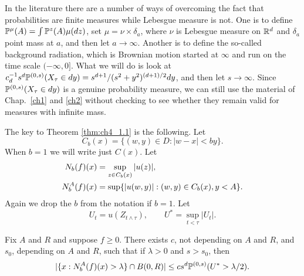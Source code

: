 In the literature there are a number of ways of overcoming the fact that probabilities are finite measures while Lebesgue measure is not. One is to define $\P^\mu(A) = \int \P^z(A)\mu(dz)$, set $\mu = \nu \times \delta_a$, where $\nu$ is Lebesgue measure on $\R^d$ and $\delta_a$ point mass at $a$, and then let $a \to \infty$. Another is to define the so-called background radiation, which is Brownian motion started at $\infty$ and run on the time scale $(-\infty,0]$. What we will do is look at $c_d^{-1}s^d\P^{(0,s)}(X_\tau \in dy) = s^{d+1}/(s^2+y^2)^{(d+1)/2}dy$, and then let $s \to \infty$. Since $\P^{(0,s)}(X_\tau \in dy)$ is a genuine probability measure, we can still use the material of Chap.\ \ref{ch1} and \ref{ch2} without checking to see whether they remain valid for measures with infinite mass.


The key to Theorem \ref{thm:ch4_1.1} is the following. Let
\begin{equation}\label{eq:ch4_1.5}
    C_b(x) = \{(w,y) \in D : |w-x| < by\}.
\end{equation}
When $b=1$ we will write just $C(x)$. Let
\begin{align}\label{eq:ch4_1.6}
    N_b(f)(x) &= \sup_{z\in C_b(x)} |u(z)|, \\
    N_b^A(f)(x) &= \sup\{|u(w,y)| : (w,y) \in C_b(x), y < A\}. \notag
\end{align}
Again we drop the $b$ from the notation if $b=1$. Let
\begin{equation}\label{eq:ch4_1.7}
    U_t = u(Z_{t\wedge\tau}), \qquad U^* = \sup_{t<\tau} |U_t|.
\end{equation}

\begin{proposition}\label{prop:ch4_1.3}
Fix $A$ and $R$ and suppose $f \geq 0$. There exists $c$, not depending on $A$ and $R$, and $s_0$, depending on $A$ and $R$, such that if $\lambda > 0$ and $s > s_0$, then
\[
|\{x : N_b^A(f)(x) > \lambda\} \cap B(0,R)| \leq cs^d\P^{(0,s)}(U^* > \lambda/2).
\]
\end{proposition}

